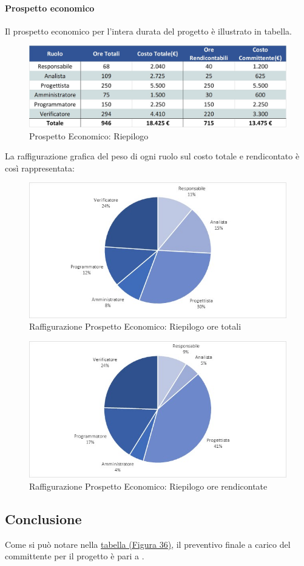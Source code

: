 \paragraph{Prospetto economico}
Il prospetto economico per l'intera durata del progetto è illustrato in tabella. 
\begin{figure}[H]
	\centerline{\includegraphics[scale=0.6]{img/Preventivo/TotaleEconomico.jpg}}\label{Totale}
	\caption{Prospetto Economico: Riepilogo}
	\clearpage
\end{figure}
\newpage
La raffigurazione grafica del peso di ogni ruolo sul costo totale e rendicontato è così rappresentata: 
\begin{figure}[H]
	\centerline{\includegraphics[scale=0.9]{img/Preventivo/Torte/Totale.jpg}}
	\caption{Raffigurazione Prospetto Economico: Riepilogo ore totali}
	\clearpage
\end{figure}
\begin{figure}[H]
	\centerline{\includegraphics[scale=0.9]{img/Preventivo/Torte/TotaleRendicontato.jpg}}
	\caption{Raffigurazione Prospetto Economico: Riepilogo ore rendicontate}
	\clearpage
\end{figure}

\subsection{Conclusione}
Come si può notare nella \hyperref[Totale]{tabella (Figura 36)}, il preventivo finale a carico del committente per il progetto è pari a .